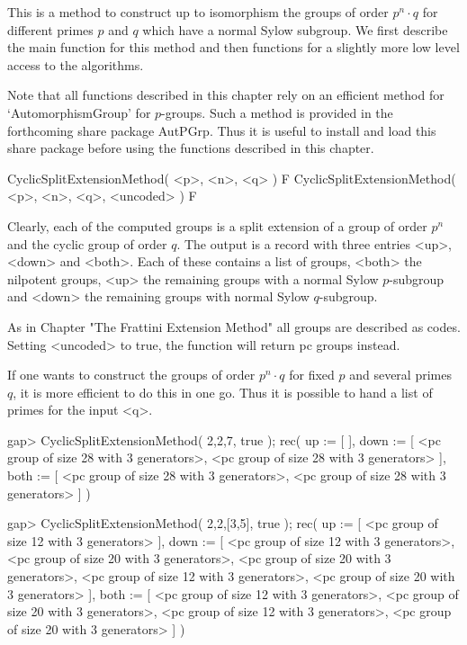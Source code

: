 


This is a method to construct up to isomorphism the groups of order
$p^n \cdot q$ for different primes $p$ and $q$ which have a normal
Sylow subgroup. We first describe the main function for this method
and then functions for a slightly more low level access to the
algorithms. 

Note that all functions described in this chapter rely on an
efficient method for `AutomorphismGroup' for $p$-groups. Such
a method is provided in the forthcoming share package AutPGrp. 
Thus it is useful to install and load this share package before
using the functions described in this chapter.


\> CyclicSplitExtensionMethod( <p>, <n>, <q> ) F
\> CyclicSplitExtensionMethod( <p>, <n>, <q>, <uncoded> ) F

Clearly, each of the computed groups is a split extension of a group
of order $p^n$ and the cyclic group of order $q$. The output is a
record with three entries <up>, <down> and <both>. Each of these 
contains a list of groups, <both> the nilpotent groups, <up> the 
remaining groups with a normal Sylow $p$-subgroup and <down> the
remaining groups with normal Sylow $q$-subgroup.

As in Chapter "The Frattini Extension Method" all groups are
described as codes. Setting <uncoded> to true, the function
will return pc groups instead.

If one wants to construct the groups of order $p^n \cdot q$
for fixed $p$ and several primes $q$, it is more efficient to
do this in one go. Thus it is possible to hand a list of primes
for the input <q>.

\beginexample
gap> CyclicSplitExtensionMethod( 2,2,7, true );    
rec( up := [  ], 
  down  := [ <pc group of size 28 with 3 generators>, 
             <pc group of size 28 with 3 generators> ], 
  both  := [ <pc group of size 28 with 3 generators>, 
             <pc group of size 28 with 3 generators> ] )

gap> CyclicSplitExtensionMethod( 2,2,[3,5], true );
rec( up := [ <pc group of size 12 with 3 generators> ], 
  down  := [ <pc group of size 12 with 3 generators>, 
             <pc group of size 20 with 3 generators>, 
             <pc group of size 20 with 3 generators>, 
             <pc group of size 12 with 3 generators>, 
             <pc group of size 20 with 3 generators> ], 
  both  := [ <pc group of size 12 with 3 generators>, 
             <pc group of size 20 with 3 generators>, 
             <pc group of size 12 with 3 generators>, 
             <pc group of size 20 with 3 generators> ] )
\endexample

